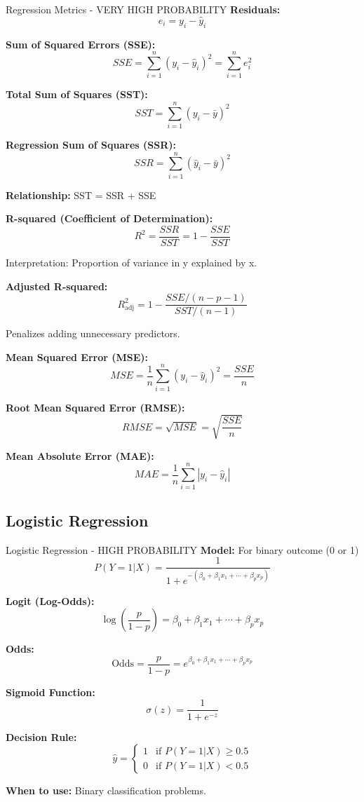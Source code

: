 \documentclass[11pt]{article}
\begin{document}
\begin{important}{Regression Metrics - VERY HIGH PROBABILITY}
\textbf{Residuals:}
\[e_i = y_{i} - \hat{y}_i\]

\textbf{Sum of Squared Errors (SSE):}
\[SSE = \sum_{i=1}^{n}(y_{i} - \hat{y}_i)^2 = \sum_{i=1}^{n}e_i^2\]

\textbf{Total Sum of Squares (SST):}
\[SST = \sum_{i=1}^{n}(y_{i} - \bar{y})^2\]

\textbf{Regression Sum of Squares (SSR):}
\[SSR = \sum_{i=1}^{n}(\hat{y}_i - \bar{y})^2\]

\textbf{Relationship:} SST = SSR + SSE

\textbf{R-squared (Coefficient of Determination):}
\[R^2 = \frac{SSR}{SST} = 1 - \frac{SSE}{SST}\]

Interpretation: Proportion of variance in y explained by x.

\textbf{Adjusted R-squared:}
\[R^2_{\text{adj}} = 1 - \frac{SSE/(n-p-1)}{SST/(n-1)}\]

Penalizes adding unnecessary predictors.

\textbf{Mean Squared Error (MSE):}
\[MSE = \frac{1}{n}\sum_{i=1}^{n}(y_{i} - \hat{y}_i)^2 = \frac{SSE}{n}\]

\textbf{Root Mean Squared Error (RMSE):}
\[RMSE = \sqrt{MSE} = \sqrt{\frac{SSE}{n}}\]

\textbf{Mean Absolute Error (MAE):}
\[MAE = \frac{1}{n}\sum_{i=1}^{n}|y_{i} - \hat{y}_i|\]
\end{important}

\subsection{Logistic Regression}

\begin{important}{Logistic Regression - HIGH PROBABILITY}
\textbf{Model:} For binary outcome (0 or 1)
\[P(Y=1|X) = \frac{1}{1 + e^{-(\beta_0 + \beta_1 x_1 + \cdots + \beta_p x_p)}}\]

\textbf{Logit (Log-Odds):}
\[\log\left(\frac{p}{1-p}\right) = \beta_0 + \beta_1 x_1 + \cdots + \beta_p x_p\]

\textbf{Odds:}
\[\text{Odds} = \frac{p}{1-p} = e^{\beta_0 + \beta_1 x_1 + \cdots + \beta_p x_p}\]

\textbf{Sigmoid Function:}
\[\sigma(z) = \frac{1}{1 + e^{-z}}\]

\textbf{Decision Rule:}
\[\hat{y} = \begin{cases}
1 & \text{if } P(Y=1|X) \geq 0.5 \\
0 & \text{if } P(Y=1|X) < 0.5
\end{cases}\]

\textbf{When to use:} Binary classification problems.
\end{important}
\end{document}
